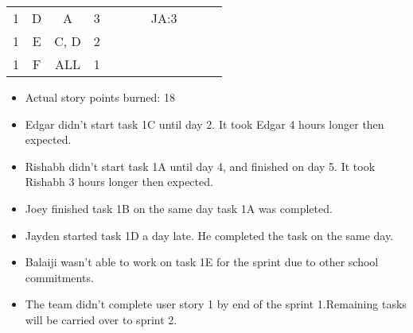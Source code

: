 \documentclass[12pt]{article}
\begin{document}
\begin{table}[H]
\begin{tabular}{@{}l|c|c|c|ccccccc@{}}
1     & D    & A          & 3                                                      &                                                 &                                                 &                                                 & JA:3                                            &                                                 &                                                 &                                                 \\
1     & E    & C, D       & 2                                                      &                                                 &                                                 &                                                 &                                                 &                                                 &                                                 &                                                 \\
1     & F    & ALL        & 1                                                      &                                                 &                                                 &                                                 &                                                 &                                                 &                                                 &                                                 \\ \bottomrule
\end{tabular}
\end{table}

\begin{itemize}%
\item Actual story points burned: 18
\item Edgar didn't start task 1C until day 2.  It took Edgar 4 hours longer then expected. 
\item Rishabh didn't start task 1A until day 4, and finished on day 5. It took Rishabh 3 hours longer then expected. 
\item Joey finished task 1B on the same day task 1A was completed.
\item Jayden started task 1D a day late. He completed the task on the same day.
\item Balaiji wasn't able to work on task 1E for the sprint due to other school commitments.
\item The team didn't complete user story 1 by end of the sprint 1.Remaining tasks will be carried over to sprint 2. 
\end{itemize}
\end{document}
